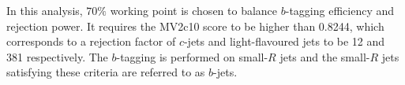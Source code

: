 In this analysis, $70\%$ working point is chosen to balance $b$-tagging efficiency and rejection power. It requires the MV2c10 score to be higher than \num{0.8244}, which corresponds to a rejection factor of $c$-jets and light-flavoured jets to be 12 and 381 respectively. The $b$-tagging is performed on small-$R$ jets and the small-$R$ jets satisfying these criteria are referred to as $b$-jets. 



